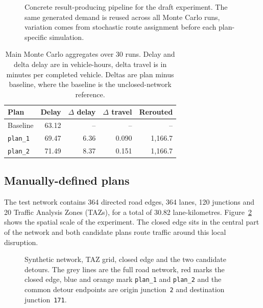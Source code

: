 \begin{figure}[H]
  \centering
  \caption{Concrete result-producing pipeline for the draft experiment. The
  same generated demand is reused across all Monte Carlo runs, variation comes
  from stochastic route assignment before each plan-specific simulation.}
  \label{fig:results_pipeline_overview}
\end{figure}

\begin{table}[H]
\centering
\begin{tabular}{@{}lrrrr@{}}
\toprule
Plan & Delay & $\Delta$ delay & $\Delta$ travel & Rerouted \\
\midrule
Baseline & 63.12 & -- & -- & -- \\
\texttt{plan\_1} & 69.47 & 6.36 & 0.090 & 1,166.7 \\
\texttt{plan\_2} & 71.49 & 8.37 & 0.151 & 1,166.7 \\
\bottomrule
\end{tabular}
\caption{Main Monte Carlo aggregates over 30 runs. Delay and delta delay are
in vehicle-hours, delta travel is in minutes per completed vehicle. Deltas are
plan minus baseline, where the baseline is the unclosed-network reference.}
\label{tab:results_mc_summary}
\end{table}

\subsection{Manually-defined plans}

The test network contains 364 directed road edges, 364 lanes, 120 junctions
and 20 Traffic Analysis Zones (TAZs), for a total of 30.82 lane-kilometres.
Figure~\ref{fig:results_network_detours} shows the spatial scale of
the experiment. The closed edge sits in the central part of the network and
both candidate plans route traffic around this local disruption.

\begin{figure}[H]
  \centering
  \caption{Synthetic network, TAZ grid, closed edge and the two candidate
  detours. The grey lines are the full road network, red marks the closed
  edge, blue and orange mark \texttt{plan\_1} and \texttt{plan\_2} and
  the common detour endpoints are origin junction~\texttt{2} and
  destination junction~\texttt{171}.}
  \label{fig:results_network_detours}
\end{figure}

